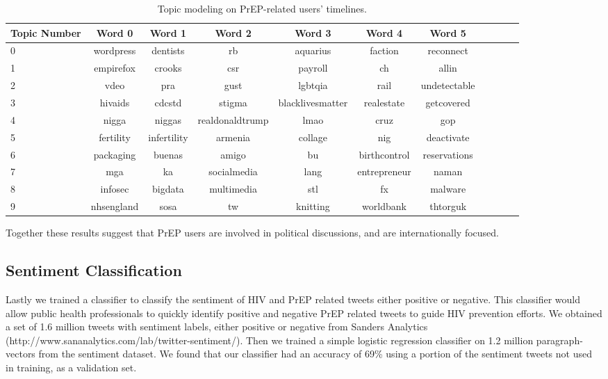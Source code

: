 \documentclass{sig-alternate-05-2015}
\begin{document}
\begin{table}
\centering
\caption{Topic modeling on PrEP-related users' timelines.}
\begin{tabular}{|l|c|c|c|c|c|c|c|c|c|c|} \hline
Topic Number & Word 0 & Word 1 & Word 2 & Word 3 & Word 4 & Word 5\\ \hline
0 & wordpress & dentists & rb & aquarius & faction & reconnect\\ \hline
1 & empirefox & crooks & csr & payroll & ch & allin\\ \hline
2 & vdeo & pra & gust & lgbtqia & rail & undetectable\\ \hline
3 & hivaids & cdcstd & stigma & blacklivesmatter & realestate & getcovered\\ \hline
4 & nigga & niggas & realdonaldtrump & lmao & cruz & gop\\ \hline
5 & fertility & infertility & armenia & collage & nig & deactivate\\ \hline
6 & packaging & buenas & amigo & bu & birthcontrol & reservations \\ \hline
7 & mga & ka & socialmedia & lang & entrepreneur & naman\\ \hline
8 & infosec & bigdata & multimedia & stl & fx & malware\\ \hline
9 & nhsengland & sosa & tw & knitting & worldbank & thtorguk\\ \hline
\hline\end{tabular}
\end{table}



Together these results suggest that PrEP users are involved in political discussions, and are internationally focused.



\subsection{Sentiment Classification}


Lastly we trained a classifier to classify the sentiment of HIV and PrEP related tweets either positive or negative. This classifier would allow public health professionals to quickly identify positive and negative PrEP related tweets to guide HIV prevention efforts. We obtained a set of 1.6 million tweets with sentiment labels, either positive or negative from Sanders Analytics (http://www.sananalytics.com/lab/twitter-sentiment/). Then we trained a simple logistic regression classifier on 1.2 million paragraph-vectors from the sentiment dataset. We found that our classifier had an accuracy of 69\% using a portion of the sentiment tweets not used in training, as a validation set.
\end{document}
